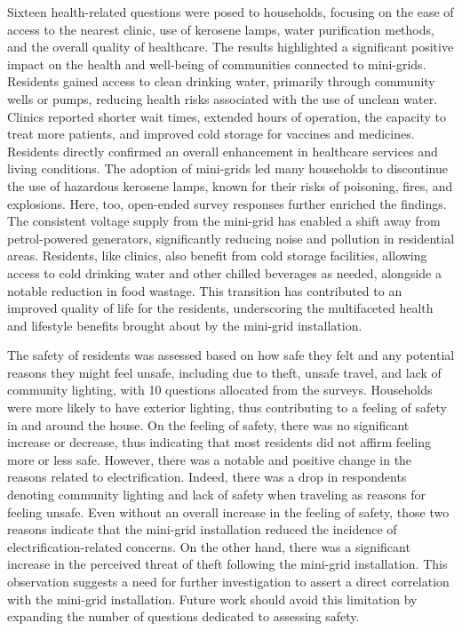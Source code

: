 Sixteen health-related questions were posed to households, focusing on the ease of access to the nearest clinic, use of kerosene lamps, water purification methods, and the overall quality of healthcare. The results highlighted a significant positive impact on the health and well-being of communities connected to mini-grids. Residents gained access to clean drinking water, primarily through community wells or pumps, reducing health risks associated with the use of unclean water.
Clinics reported shorter wait times, extended hours of operation, the capacity to treat more patients, and improved cold storage for vaccines and medicines. Residents directly confirmed an overall enhancement in healthcare services and living conditions.
The adoption of mini-grids led many households to discontinue the use of hazardous kerosene lamps, known for their risks of poisoning, fires, and explosions. Here, too, open-ended survey responses further enriched the findings. The consistent voltage supply from the mini-grid has enabled a shift away from petrol-powered generators, significantly reducing noise and pollution in residential areas. Residents, like clinics, also benefit from cold storage facilities, allowing access to cold drinking water and other chilled beverages as needed, alongside a notable reduction in food wastage. This transition has contributed to an improved quality of life for the residents, underscoring the multifaceted health and lifestyle benefits brought about by the mini-grid installation.

The safety of residents was assessed based on how safe they felt and any potential reasons they might feel unsafe, including due to theft, unsafe travel, and lack of community lighting, with 10 questions allocated from the surveys. Households were more likely to have exterior lighting, thus contributing to a feeling of safety in and around the house. On the feeling of safety, there was no significant increase or decrease, thus indicating that most residents did not affirm feeling more or less safe. However, there was a notable and positive change in the reasons related to electrification. Indeed, there was a drop in respondents denoting community lighting and lack of safety when traveling as reasons for feeling unsafe. Even without an overall increase in the feeling of safety, those two reasons indicate that the mini-grid installation reduced the incidence of electrification-related concerns. On the other hand, there was a significant increase in the perceived threat of theft following the mini-grid installation. This observation suggests a need for further investigation to assert a direct correlation with the mini-grid installation. Future work should avoid this limitation by expanding the number of questions dedicated to assessing safety.


